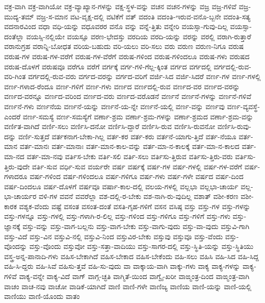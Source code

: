 {ವಕ್ರ-ವಾಗಿ
ವಕ್ರ-ವಾಗಿಯೋ
ವಕ್ರ-ವ್ಯಾಖ್ಯಾನ-ಗಳನ್ನು
ವಕ್ಷ-ಸ್ಥಳ-ವನ್ನು
ವಚನ
ವಚನ-ಗಳನ್ನು
ವಜ್ರ
ವಜ್ರ-ಗಳಿವೆ
ವಜ್ರ-ಮುದ್ಯ-ತಮ್
ವಜ್ರ-ಸ-ಮಾನ
ವಟ-ವೃಕ್ಷ-ದಲ್ಲಿ
ವಟಿಕೆಗೆ
ವತ್
ವದಂತಿ
ವದಂತಿ-ಇರುವ-ವನೊ-ಬ್ಬನೇ
ವದಂತಿ-ಸತ್ಯ
ವದನಾರವಿಂದ
ವಧಾ
ವಧಿ-ಯನ್ನು
ವಧೂವರರ
ವನೊ
ವನ್ನು
ವನ್ನೆ-ತ್ತಿತು
ವನ್ನೇರಿ
ವಯಸ್ಸಾ-ಗುವು-ದಿಲ್ಲ
ವಯಸ್ಸಾ-ದಂತೆಲ್ಲಾ
ವಯಸ್ಸಿ-ನಲ್ಲಿಯೇ
ವಯಸ್ಸೂ
ವರಣ-ಭೇದಸ್ತು
ವರದಿಯ
ವರದಿ-ಯನ್ನು
ವರನ್ನು
ವರಲ್ಲಿ
ವರಾಗಿ-ರುತ್ತಾರೆ
ವರಾನುಗ್ರಹ
ವರಾನ್ನಿ-ಬೋಧತ
ವರಿಯ-ಬಹುದು
ವರಿ-ಯಲು
ವರಿ-ಸಲು
ವರು
ವರುಣ
ವರುಣ-ನಿಗೂ
ವರುಷ
ವರುಷ-ಗಳ
ವರುಷ-ಗಳ-ವರೆಗೆ
ವರುಷ-ಗಳ-ವೆರೆಗೆ
ವರುಷ-ಗಳಿಂದ
ವರುಷ-ಗಳಿಂದಲೂ
ವರುಷ-ಗಳು
ವರುಷದ
ವರುಷ-ದೊಳಗೆ
ವರುಷವೂ
ವರೆಗೂ
ವರೆಗೆ
ವರ್ಗಕ್ಕೆ
ವರ್ಗ-ಗಳಿ-ಗೆಲ್ಲ-ಕ್ಕಿಂತ
ವರ್ಗದ
ವರ್ಗದಲ್ಲಿ
ವರ್ಗದಲ್ಲಿ-ರುವ-ವರಿ-ಗಿಂತ
ವರ್ಗದಲ್ಲಿ-ರುವ-ವರು
ವರ್ಗದ-ವರನ್ನು
ವರ್ಗದ-ವರಿಗೆ
ವರ್ಜಿ-ಸಿದ
ವರ್ಜಿ-ಸಿದರೆ
ವರ್ಣ-ಗಳ
ವರ್ಣ-ಗಳಲ್ಲಿ
ವರ್ಣ-ಗಳಾದ-ರೆಂದೂ
ವರ್ಣ-ಗಳಿಗೆ
ವರ್ಣ-ಗಳು
ವರ್ಣದ
ವರ್ಣದಲ್ಲಿ-ರುವ
ವರ್ಣದ-ವರ
ವರ್ಣದ-ವರನ್ನು
ವರ್ಣದ-ವರನ್ನೂ
ವರ್ಣದ-ವರಿಂದ
ವರ್ಣದ-ವರು
ವರ್ಣದ-ವರೊಡನೆ
ವರ್ಣನೆ
ವರ್ಣನೆ-ಗಳನ್ನು
ವರ್ಣನೆ-ಗಳಿವೆ
ವರ್ಣನೆ-ಗಳು
ವರ್ಣನೆಯ
ವರ್ಣನೆ-ಯನ್ನು
ವರ್ಣನೆ-ಯ-ನ್ನೇ
ವರ್ಣನೆ-ಯಲ್ಲಿ
ವರ್ಣ-ವನ್ನು
ವರ್ಣವು
ವರ್ಣ-ವ್ಯವಸ್ಥೆ-ಎಂದರೆ
ವರ್ಣ-ಸಮಸ್ಯೆ
ವರ್ಣ-ಸಮಸ್ಯೆಗೆ
ವರ್ಣಾ-ಶ್ರಮ
ವರ್ಣಾ-ಶ್ರಮ-ಗಳನ್ನು
ವರ್ಣಾ-ಶ್ರಮದ
ವರ್ಣಾ-ಶ್ರಮ-ವನ್ನು
ವರ್ಣಿತ-ವಾಗಿದೆ
ವರ್ಣಿ-ಸಲು
ವರ್ಣಿಸಿ-ದನೋ
ವರ್ಣಿಸಿ-ದ್ದಾರೆ
ವರ್ಣಿಸಿ-ರುವ
ವರ್ಣಿಸಿ-ರುವನೋ
ವರ್ಣಿಸಿ-ರುವು-ದನ್ನು
ವರ್ಣಿ-ಸುತ್ತದೆ
ವರ್ತಕನಾಗ-ಬೇಕಾ-ಗಿಲ್ಲ
ವರ್ತ-ಕರ
ವರ್ತ-ಕರು
ವರ್ತನೆ-ಯಾಗು-ತ್ತಿದೆ
ವರ್ತ-ನೆಯೂ
ವರ್ತ-ಮಾನ
ವರ್ತ-ಮಾನಃ
ವರ್ತ-ಮಾನಾಃ
ವರ್ತ-ಮಾನ-ಕಾಲ-ವನ್ನು
ವರ್ತ-ಮಾ-ನ-ಕಾಲಕ್ಕೆ
ವರ್ತ-ಮಾ-ನ-ಕಾಲದ
ವರ್ತ-ಮಾ-ನದ
ವರ್ತ-ಮಾ-ನವು
ವರ್ತಿಸ-ಬೇಕು
ವರ್ತಿ-ಸಲಿ
ವರ್ತಿ-ಸಲು
ವರ್ತಿಸು-ತ್ತಿರುವ
ವರ್ತಿಸು-ತ್ತಿರು-ವರು
ವರ್ತಿಸು-ತ್ತಿರು-ವುದೇ
ವರ್ತಿ-ಸುವ
ವರ್ಧಿ-ಸುವ
ವರ್ಯರೇ
ವರ್ಷ
ವರ್ಷಕ್ಕೆ
ವರ್ಷ-ಗಳ
ವರ್ಷ-ಗಳಲ್ಲಿ
ವರ್ಷ-ಗಳ-ವರೆಗೆ
ವರ್ಷ-ಗಳಾದರೂ
ವರ್ಷ-ಗಳಿಂದ
ವರ್ಷ-ಗಳಿಂದಲೂ
ವರ್ಷ-ಗಳಿಗೂ
ವರ್ಷ-ಗಳು
ವರ್ಷ-ಗಳೇ
ವರ್ಷದ
ವರ್ಷ-ದಿಂದ
ವರ್ಷ-ದಿಂದಲೂ
ವರ್ಷ-ದೊಳಗೆ
ವರ್ಷವೂ
ವರ್ಷಾ-ಕಾಲ-ದಲ್ಲಿ
ವಲಯ-ಗಳಲ್ಲಿ
ವಲ್ಲಭಾ
ವಲ್ಲಭಾ-ಚಾರ್ಯ
ವಲ್ಲ-ಭಾ-ಚಾರ್ಯರ
ವಳಿ-ಗಳ
ವವನೆ
ವವರೆಲ್ಲಾ
ವಶ-ದಲ್ಲಿ-ರ-ಬೇಕು
ವಶ-ನಾಗಿ-ರು-ವುದಿಲ್ಲ
ವಶಾತ್
ವಶೀ-ಕರಣ
ವಶೀ-ಕಾರಕ
ವಶ್ಯಕ-ವೆಂದು
ವಷ್ಟೆ
ವಸಂತ
ವಸಂತ-ದಂತೆ
ವಸತಿ-ಗೃಹ-ಗಳಿಗೆ
ವಸನ
ವಸಿಷ್ಠ
ವಸ್ತು
ವಸ್ತು-ಗಳ
ವಸ್ತು-ಗಳನ್ನು
ವಸ್ತು-ಗಳನ್ನೂ
ವಸ್ತು-ಗಳಲ್ಲಿ
ವಸ್ತು-ಗಳಾಗಿ-ರ-ಲಿಲ್ಲ
ವಸ್ತು-ಗಳಿಂದ
ವಸ್ತು-ಗಳಿಗೂ
ವಸ್ತು-ಗಳಿಗೆ
ವಸ್ತು-ಗಳು
ವಸ್ತು-ಜ್ಞಾನಕ್ಕೆ
ವಸ್ತು-ವನ್ನು
ವಸ್ತು-ವಾಗ-ಬಲ್ಲನು
ವಸ್ತು-ವಾಗ-ಬೇಕು
ವಸ್ತು-ವಾಗು-ವುದು
ವಸ್ತು-ವಾ-ವುದು
ವಸ್ತುವಿ-ಗಾಗಿ
ವಸ್ತು-ವಿದೆ
ವಸ್ತು-ವಿನ
ವಸ್ತುವಿ-ನಲ್ಲಿ
ವಸ್ತುವಿ-ನಿಂದ
ವಸ್ತುವಿರ-ಬೇಕು
ವಸ್ತುವು
ವಸ್ತುವೂ
ವಸ್ತು-ವೆಂದು
ವಸ್ತು-ವೊಂದನ್ನು
ವಸ್ತು-ವೊಂದು
ವಸ್ತುವೋ
ವಸ್ತು-ಸತ್ತಾ-ವಾದಿಯು
ವಸ್ತು-ಸಾಗರ-ದಲ್ಲಿ
ವಸ್ತು-ಸ್ಥಿತಿ-ಯನ್ನು
ವಸ್ತು-ಸ್ಥಿತಿಯು
ವಸ್ತ್ರ-ಅನ್ನ-ಪಾನಾದಿ-ಗಳು
ವಹಿಸ-ಬೇಕಾಗಿದೆ
ವಹಿಸ-ಬೇಕಾದ
ವಹಿಸ-ಬೇಕೆಂದು
ವಹಿ-ಸಲು
ವಹಿಸಿ
ವಹಿ-ಸಿದ
ವಹಿ-ಸಿದ್ದ
ವಹಿ-ಸಿ-ದ್ದರು
ವಹಿ-ಸಿವೆ
ವಹಿಸು-ತ್ತವೆ
ವಹಿ-ಸು-ವುದು
ವಾ
ವಾಕ್ಕಾಯ-ವಾಗಿ
ವಾಕ್ಕು-ಗಳು
ವಾಕ್ಯ
ವಾಕ್ಯ-ಗಳನ್ನು
ವಾಕ್ಯ-ಗಳಿವೆ
ವಾಕ್ಯ-ವನ್ನೇ
ವಾಕ್ಯ-ವಿದೆ
ವಾಗ್
ವಾಗ್ಗ-ಚ್ಛತಿ
ವಾಗ್ಮಿತೆ-ಯಿಂದ
ವಾಗ್ವೈ-ಖರೀ
ವಾಙ್ಮಂತ್ರ-ದಿಂದ
ವಾಙ್ಮಂತ್ರ-ವಾಗಿ
ವಾಚಂ
ವಾಚ-ನವು
ವಾಚೋ
ವಾಡಿಕೆ-ಯಾಗಿದೆ
ವಾಣಿ
ವಾಣಿ-ಗಳೇ
ವಾಣಿಜ್ಯ
ವಾಣಿಯ
ವಾಣಿ-ಯನ್ನು
ವಾಣಿ-ಯಲ್ಲಿ
ವಾಣಿಯು
ವಾಣಿ-ಯೊಂದು
ವಾತಂ
}
